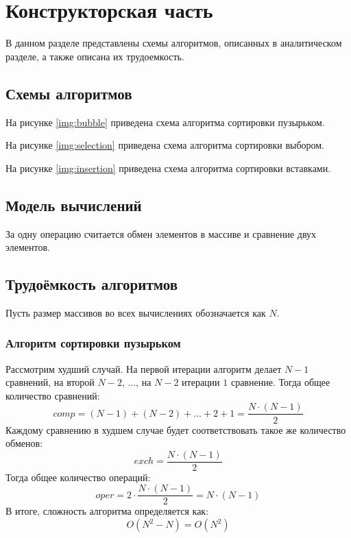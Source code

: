 \chapter{Конструкторская часть}

В данном разделе представлены схемы алгоритмов, описанных в аналитическом разделе, а также описана их трудоемкость.

\section{Схемы алгоритмов}

На рисунке \ref{img:bubble} приведена схема алгоритма сортировки пузырьком.


\clearpage

На рисунке \ref{img:selection} приведена схема алгоритма сортировки выбором.


\clearpage

На рисунке \ref{img:insertion} приведена схема алгоритма сортировки вставками.


\section{Модель вычислений}

За одну операцию считается обмен элементов в массиве и сравнение двух элементов.

\section{Трудоёмкость алгоритмов}

Пусть размер массивов во всех вычислениях обозначается как $N$.

\subsection{Алгоритм сортировки пузырьком}

Рассмотрим худший случай. На первой итерации алгоритм делает $N-1$ сравнений, на второй $N-2$, ..., на $N-2$ итерации $1$ сравнение. Тогда общее количество сравнений:
\begin{equation}
	comp = (N-1) + (N-2) + ... + 2 + 1 = \frac{N \cdot (N-1)}{2}
\end{equation}
Каждому сравнению в худшем случае будет соответствовать такое же количество обменов:
\begin{equation}
	exch = \frac{N \cdot (N-1)}{2}
\end{equation}
Тогда общее количество операций:
\begin{equation}
	oper = 2 \cdot \frac{N \cdot (N-1)}{2} = N \cdot (N-1)
\end{equation}
В итоге, сложность алгоритма определяется как:
\begin{equation}
	O(N^2 - N) = O(N^2)
\end{equation}

